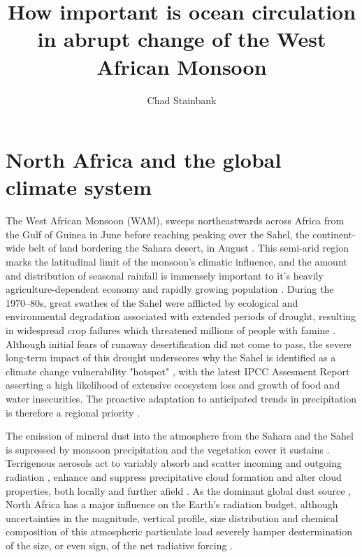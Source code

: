 \documentclass[a4paper]{article}
\begin{document}
\title{How important is ocean circulation in abrupt change of the West African Monsoon}
\author{Chad Stainbank}
\maketitle

\section{North Africa and the global climate system}
\label{sec:sahelwam}
The West African Monsoon (WAM), sweeps northeastwards across Africa from the Gulf of Guinea in June before reaching peaking over the Sahel, the continent-wide belt of land bordering the Sahara desert, in August \parencite{sultan2003west2, nicholson2013west}.
This semi-arid region marks the latitudinal limit of the monsoon's climatic influence, and the amount and distribution of seasonal rainfall is immensely important to it's heavily agriculture-dependent economy and rapidly growing population \parencite{sissoko2011agriculture}.
During the 1970--80s, great swathes of the Sahel were afflicted by ecological and environmental degradation associated with extended periods of drought, resulting in widespread crop failures which threatened millions of people with famine \parencite{benson1998impact, olsson1993causes, walther2016review}.
Although initial fears of runaway desertification \parencite{charney1975dynamics, charney1975drought} did not come to pass, the severe long-term impact of this drought underscores why the Sahel is identified as a climate change vulnerability "hotspot" \parencite{diffenbaugh2012climate}, with the latest IPCC Assesment Report \parencite{ipcc2014impacts} asserting a high likelihood of extensive ecosystem loss and growth of food and water insecurities.
The proactive adaptation to anticipated trends in precipitation is therefore a regional priority \parencite{lobell2008prioritizing, sarr2012present}.

The emission of mineral dust into the atmosphere from the Sahara and the Sahel is supressed by monsoon precipitation and the vegetation cover it sustains \parencite{brooks2000dust, cowie2013vegetation}.
Terrigenous aerosols act to variably absorb and scatter incoming and outgoing radiation \parencite{andreae1995climatic, tegen1996influence, haywood2000estimates}, enhance and suppress precipitative cloud formation and alter cloud properties, both locally and further afield \parencite{rosenfeld2001desert, demott2003african, huang2006possible, karydis2011effect}.  
As the dominant global dust source \parencite{tanaka2006numerical}, North Africa has a major influence on the Earth's radiation budget, although uncertainties in the magnitude, vertical profile, size distribution and chemical composition of this atmospheric particulate load severely hamper destermination of the size, or even sign, of the net radiative forcing \parencite{claquin1998uncertainties, sokolik2001introduction, durant2009sensitivity}.
\end{document}
